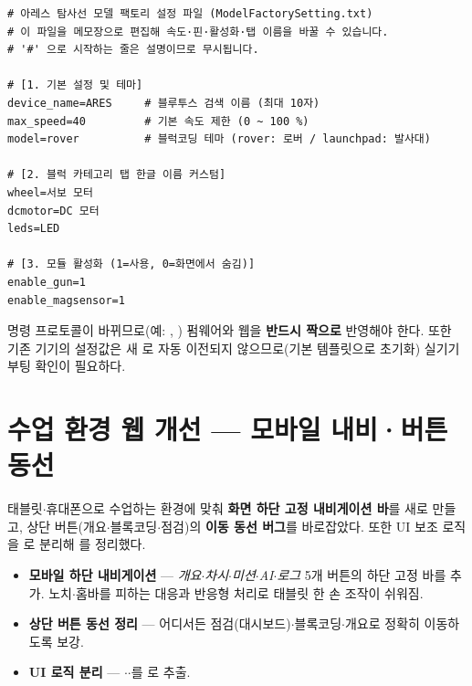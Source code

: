 \begin{verbatim}
# 아레스 탐사선 모델 팩토리 설정 파일 (ModelFactorySetting.txt)
# 이 파일을 메모장으로 편집해 속도·핀·활성화·탭 이름을 바꿀 수 있습니다.
# '#' 으로 시작하는 줄은 설명이므로 무시됩니다.

# [1. 기본 설정 및 테마]
device_name=ARES     # 블루투스 검색 이름 (최대 10자)
max_speed=40         # 기본 속도 제한 (0 ~ 100 %)
model=rover          # 블럭코딩 테마 (rover: 로버 / launchpad: 발사대)

# [2. 블럭 카테고리 탭 한글 이름 커스텀]
wheel=서보 모터
dcmotor=DC 모터
leds=LED

# [3. 모듈 활성화 (1=사용, 0=화면에서 숨김)]
enable_gun=1
enable_magsensor=1
\end{verbatim}

\begin{notebox}
명령 프로토콜이 바뀌므로(예: , ) 펌웨어와
웹을 \textbf{반드시 짝으로} 반영해야 한다. 또한 기존 기기의 
설정값은 새 로 자동 이전되지 않으므로(기본
템플릿으로 초기화) 실기기 부팅 확인이 필요하다.
\end{notebox}

\section{수업 환경 웹 개선 — 모바일 내비·버튼 동선}
태블릿$\cdot$휴대폰으로 수업하는 환경에 맞춰 \textbf{화면 하단 고정 내비게이션 바}를
새로 만들고, 상단 버튼(개요$\cdot$블록코딩$\cdot$점검)의 \textbf{이동 동선 버그}를
바로잡았다. 또한 UI 보조 로직을 로 분리해 를 정리했다.

\begin{itemize}
  \item \textbf{모바일 하단 내비게이션} — \emph{개요$\cdot$차시$\cdot$미션$\cdot$AI$\cdot$로그} 5개
  버튼의 하단 고정 바를 추가. 노치$\cdot$홈바를 피하는  대응과
  반응형 처리로 태블릿 한 손 조작이 쉬워짐.
  \item \textbf{상단 버튼 동선 정리} — 어디서든 점검(대시보드)$\cdot$블록코딩$\cdot$개요로
  정확히 이동하도록 보강.
  \item \textbf{UI 로직 분리} — $\cdot$$\cdot$를 로 추출.
\end{itemize}

